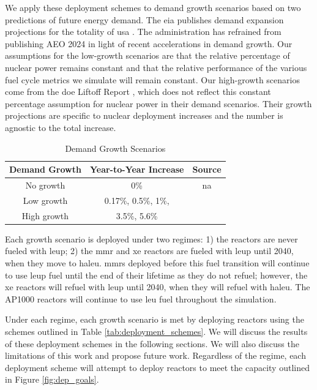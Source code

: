 We apply these deployment schemes to demand growth scenarios based on two
predictions of future energy demand. The \gls{eia} publishes demand expansion
projections for the totality of \gls{usa} \cite{eia_aeo_2023}. The
administration has refrained from publishing AEO 2024 in light of recent
accelerations in demand growth. Our assumptions for the low-growth scenarios
are that the relative percentage of nuclear power remains constant and that the
relative performance of the various fuel cycle metrics we simulate will remain
constant. Our high-growth scenarios come from the \gls{doe} Liftoff Report
\cite{julie_liftoff_pathways_2024}, which does not reflect this constant
percentage assumption for nuclear power in their demand scenarios. Their growth
projections are specific to nuclear deployment increases and the number is
agnostic to the total increase.

\begin{table}[H]
    \centering
    \caption{Demand Growth Scenarios}
    \label{tab:demand_scenarios}
    \begin{tabular}{c c c}
        \hline
        \textbf{Demand Growth} & \textbf{Year-to-Year Increase} & \textbf{Source}\\
        \hline
        No growth & 0\% & na\\
        Low growth & 0.17\%, 0.5\%, 1\%, & \cite{eia_aeo_2023}\\
        High growth & 3.5\%, 5.6\% & \cite{julie_liftoff_pathways_2024}\\
        \hline
    \end{tabular}
\end{table}

Each growth scenario is deployed under two regimes: 1) the reactors are never
fueled with \gls{leup}; 2) the \gls{mmr} and \gls{xe} reactors are fueled with
\gls{leup} until 2040, when they move to \gls{haleu}. \glspl{mmr} deployed
before this fuel transition will continue to use \gls{leup} fuel until the end
of their lifetime as they do not refuel; however, the \gls{xe} reactors will
refuel with \gls{leup} until 2040, when they will refuel with \gls{haleu}. The
AP1000 reactors will continue to use \gls{leu} fuel throughout the simulation.

Under each regime, each growth scenario is met by deploying reactors using the
schemes outlined in Table \ref{tab:deployment_schemes}. We will discuss the
results of these deployment schemes in the following sections. We will also
discuss the limitations of this work and propose future work. Regardless of the
regime, each deployment scheme will attempt to deploy reactors to meet the
capacity outlined in Figure \ref{fig:dep_goals}.

